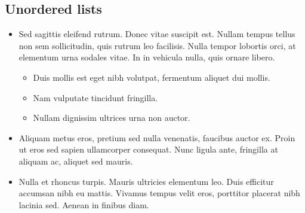 \documentclass[letterpaper,10pt,english]{sphinxmanual}
\begin{document}
\subsection{Unordered lists}
\label{\detokenize{markdown:unordered-lists}}\begin{itemize}
\item {} 
Sed sagittis eleifend rutrum. Donec vitae suscipit est. Nullam tempus tellus
non sem sollicitudin, quis rutrum leo facilisis. Nulla tempor lobortis orci,
at elementum urna sodales vitae. In in vehicula nulla, quis ornare libero.
\begin{itemize}
\item {} 
Duis mollis est eget nibh volutpat, fermentum aliquet dui mollis.

\item {} 
Nam vulputate tincidunt fringilla.

\item {} 
Nullam dignissim ultrices urna non auctor.

\end{itemize}

\item {} 
Aliquam metus eros, pretium sed nulla venenatis, faucibus auctor ex. Proin ut
eros sed sapien ullamcorper consequat. Nunc ligula ante, fringilla at aliquam
ac, aliquet sed mauris.

\item {} 
Nulla et rhoncus turpis. Mauris ultricies elementum leo. Duis efficitur
accumsan nibh eu mattis. Vivamus tempus velit eros, porttitor placerat nibh
lacinia sed. Aenean in finibus diam.

\end{itemize}
\end{document}
